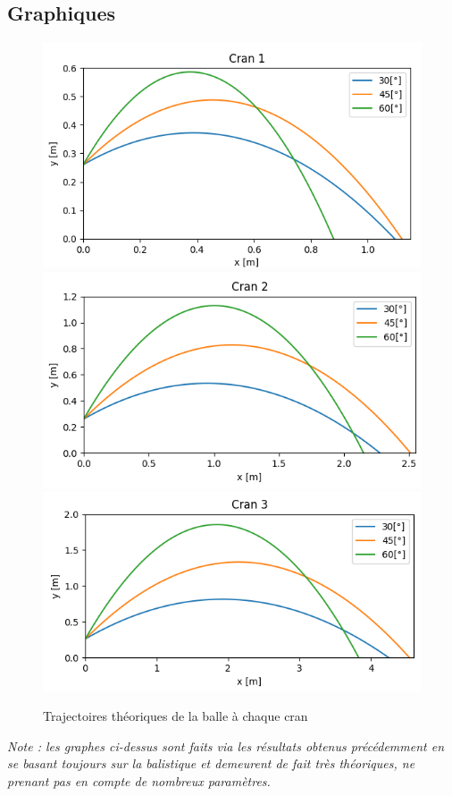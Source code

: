\documentclass[11pt]{article}
\begin{document}
\subsection{Graphiques}
\begin{center}
\begin{figure}[H] 
  \caption{Trajectoires théoriques de la balle à chaque cran}					
  \centering
  \includegraphics[scale=0.75]{graph1.png}
  \includegraphics[scale=0.75]{graph2.png}
  \includegraphics[scale=0.75]{graph3.png}
  \label{fig:traj}
\end{figure}
\end{center}
\textit{Note : les graphes ci-dessus sont faits via les résultats obtenus précédemment en se basant toujours sur la balistique et demeurent de fait très théoriques, ne prenant pas en compte de nombreux paramètres.}
	
\end{document}
